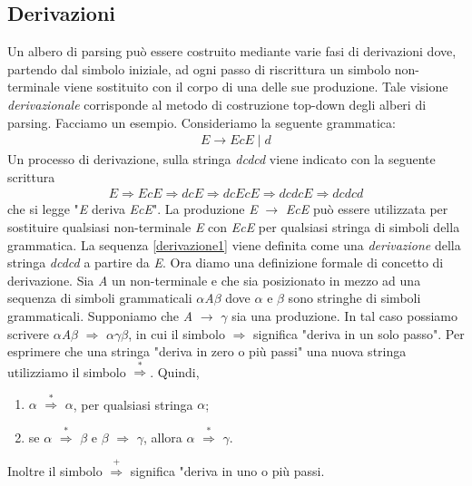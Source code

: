 \subsection{Derivazioni}
Un albero di parsing \cite{libro: compilatori} può essere costruito mediante varie fasi di derivazioni dove, partendo dal simbolo iniziale, ad ogni passo di riscrittura un simbolo non-terminale viene sostituito con il corpo di una delle sue produzione. Tale visione \textit{derivazionale} corrisponde al metodo di costruzione top-down degli alberi di parsing.
Facciamo un esempio. Consideriamo la seguente grammatica:
\begin{align}\label{grammaticaEspressioni}
	E \to EcE \mid d 
\end{align}
Un processo di derivazione, sulla stringa \textit{dcdcd} viene indicato con la seguente scrittura
\begin{align}\label{derivazione1}
	E \Rightarrow EcE \Rightarrow dcE \Rightarrow dcEcE \Rightarrow dcdcE \Rightarrow dcdcd
\end{align}
che si legge "\textit{E} deriva \textit{EcE}". La produzione \textit{E} $\to$ \textit{EcE} può essere utilizzata per sostituire qualsiasi non-terminale \textit{E} con \textit{EcE} per qualsiasi stringa di simboli della grammatica. La sequenza \ref{derivazione1} viene definita come una \textit{derivazione} della stringa \textit{dcdcd} a partire da \textit{E}. Ora diamo una definizione formale di concetto di derivazione. Sia \textit{A} un non-terminale e che sia posizionato in mezzo ad una sequenza di simboli grammaticali $\alpha$\textit{A}$\beta$ dove $\alpha$ e $\beta$ sono stringhe di simboli grammaticali. Supponiamo che \textit{A} $\to$ $\gamma$ sia una produzione. In tal caso possiamo scrivere $\alpha$\textit{A}$\beta$ $\Rightarrow$ $\alpha$$\gamma$$\beta$, in cui il simbolo $\Rightarrow$ significa "deriva in un solo passo". Per esprimere che una stringa "deriva in zero o più passi" una nuova stringa utilizziamo il simbolo $\overset{*}{\Rightarrow}$. Quindi, 
\begin{enumerate}
	\item $\alpha$ $\overset{*}{\Rightarrow}$ $\alpha$, per qualsiasi stringa $\alpha$;
	\item  se $\alpha$ $\overset{*}{\Rightarrow}$ $\beta$ e $\beta$ $\Rightarrow$ $\gamma$, allora $\alpha$ $\overset{*}{\Rightarrow}$ $\gamma$.
\end{enumerate} 
Inoltre il simbolo $\overset{+}{\Rightarrow}$ significa "deriva in uno o più passi. \par
